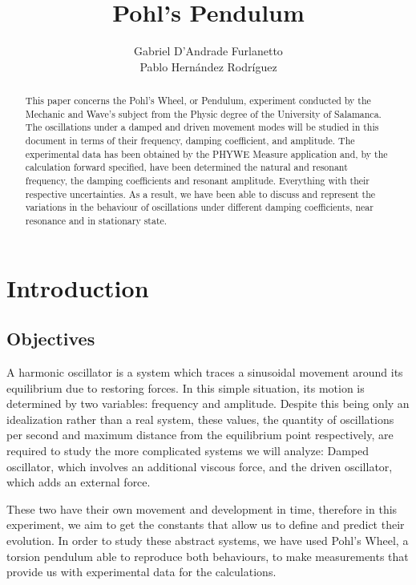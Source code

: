 \documentclass[a4paper,12pt]{article}
\begin{document}
\title{Pohl's Pendulum}
\author{Gabriel D'Andrade Furlanetto \\ Pablo Hernández Rodríguez }
\maketitle
\pagebreak 
\begin{abstract}
    This paper concerns the Pohl’s Wheel, or Pendulum, experiment conducted by the Mechanic and Wave’s subject from the Physic degree of the University of Salamanca. The oscillations under a damped and driven movement modes will be studied in this document in terms of their frequency, damping coefficient, and amplitude. The experimental data has been obtained by the PHYWE Measure application and, by the calculation forward specified, have been determined the natural and resonant frequency, the damping coefficients and resonant amplitude. Everything with their respective uncertainties.
    As a result, we have been able to discuss and represent the variations in the behaviour of oscillations under different damping coefficients, near resonance and in  stationary state.
\end{abstract}
\pagebreak

\section{Introduction}

\subsection{Objectives}

A harmonic oscillator is a system which traces a sinusoidal movement around its equilibrium due to restoring forces. In this simple situation, its motion is determined by two variables: frequency and amplitude. Despite this being only an idealization rather than a real system, these values, the quantity of oscillations per second and maximum distance from the equilibrium point respectively, are required to study the more complicated systems we will analyze: Damped oscillator, which involves an additional viscous force, and the driven oscillator, which adds an external force.

 These two have their own movement and development in time, therefore in this experiment, we aim to get the constants that allow us to define and predict their evolution. In order to study these abstract systems, we have used Pohl’s Wheel, a torsion pendulum able to reproduce both behaviours, to make measurements that provide us with experimental data for the calculations.
\end{document}
